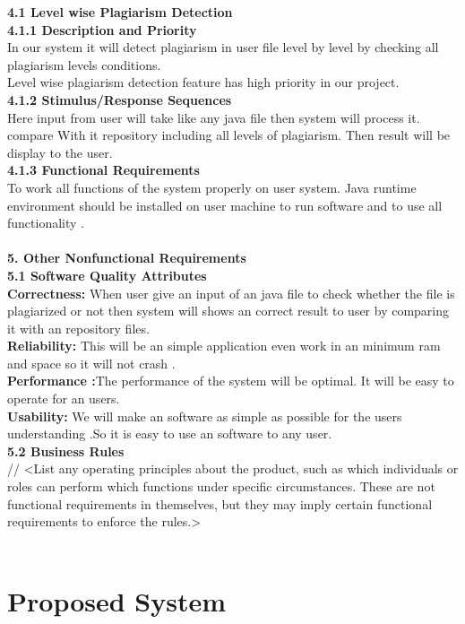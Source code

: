 \textbf{4.1	Level wise Plagiarism Detection }\\
\textbf{4.1.1	Description and Priority}\\
In our system it will detect plagiarism in user file level by level by  checking all  plagiarism levels conditions.\\
Level wise plagiarism detection feature has high priority in our project. \\
\textbf{4.1.2  Stimulus/Response Sequences}\\
Here input from user will take like any java file then system will process it. compare With it repository including all levels of plagiarism. Then result will be display to the user.\\
\textbf{4.1.3	Functional Requirements}\\
To work all functions of the system properly on user system. Java runtime environment should be installed on user machine to run software and to use all functionality . \\\\
\textbf{5.	Other Nonfunctional Requirements}\\
\textbf{5.1	Software Quality Attributes}\\
\textbf{Correctness:} When user give an input of an java file to check whether the file is plagiarized or not then system will shows an correct result to user by comparing it with an repository files.\\
\textbf{Reliability:} This will be an simple application even work in an minimum ram and space so it will not crash .\\
\textbf{Performance :}The performance of the system will be optimal. It will be easy to operate for an users.\\
\textbf{Usability:} We will make an software as simple as possible for the users understanding .So it is easy to use an software to any user.\\
\textbf{5.2	Business Rules}\\
//
<List any operating principles about the product, such as which individuals or roles can perform which functions under specific circumstances. These are not functional requirements in themselves, but they may imply certain functional requirements to enforce the rules.>\\\\




\section{Proposed System}

